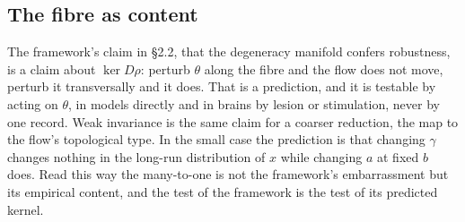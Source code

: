 \documentclass[10pt]{article}
\begin{document}
\subsection{The fibre as content}
The framework's claim in \S2.2, that the degeneracy manifold confers robustness, is a claim about $\ker D\rho$: perturb $\theta$ along the fibre and the flow does not move, perturb it transversally and it does. That is a prediction, and it is testable by acting on $\theta$, in models directly and in brains by lesion or stimulation, never by one record. Weak invariance is the same claim for a coarser reduction, the map to the flow's topological type. In the small case the prediction is that changing $\gamma$ changes nothing in the long-run distribution of $x$ while changing $a$ at fixed $b$ does. Read this way the many-to-one is not the framework's embarrassment but its empirical content, and the test of the framework is the test of its predicted kernel.
\end{document}
